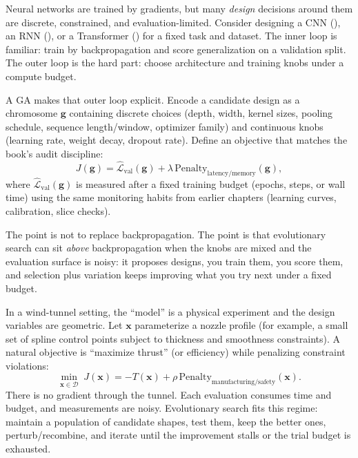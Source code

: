 \begin{tcolorbox}[summarybox, title={Application example: GA over neural networks (outer-loop design search)}]
Neural networks are trained by gradients, but many \emph{design} decisions around them are discrete, constrained, and evaluation\hyp{}limited. Consider designing a CNN (), an RNN (), or a Transformer () for a fixed task and dataset. The inner loop is familiar: train by backpropagation and score generalization on a validation split. The outer loop is the hard part: choose architecture and training knobs under a compute budget.
\par\smallskip
A GA makes that outer loop explicit. Encode a candidate design as a chromosome \(\mathbf{g}\) containing discrete choices (depth, width, kernel sizes, pooling schedule, sequence length/window, optimizer family) and continuous knobs (learning rate, weight decay, dropout rate). Define an objective that matches the book's audit discipline:
\[
J(\mathbf{g}) = \widehat{\mathcal{L}}_{\text{val}}(\mathbf{g})
  + \lambda\,\mathrm{Penalty}_{\text{latency/memory}}(\mathbf{g}),
\]
where \(\widehat{\mathcal{L}}_{\text{val}}(\mathbf{g})\) is measured after a fixed training budget (epochs, steps, or wall time) using the same monitoring habits from earlier chapters (learning curves, calibration, slice checks).
\par\smallskip
The point is not to replace backpropagation. The point is that evolutionary search can sit \emph{above} backpropagation when the knobs are mixed and the evaluation surface is noisy: it proposes designs, you train them, you score them, and selection plus variation keeps improving what you try next under a fixed budget.
\end{tcolorbox}

\begin{tcolorbox}[summarybox, title={Application example: jet-nozzle shape optimization (experiment in the loop)}]
In a wind-tunnel setting, the ``model'' is a physical experiment and the design variables are geometric. Let \(\mathbf{x}\) parameterize a nozzle profile (for example, a small set of spline control points subject to thickness and smoothness constraints). A natural objective is ``maximize thrust'' (or efficiency) while penalizing constraint violations:
\[
\min_{\mathbf{x}\in\mathcal{D}} \; J(\mathbf{x}) = -T(\mathbf{x}) + \rho\,\mathrm{Penalty}_{\text{manufacturing/safety}}(\mathbf{x}).
\]
There is no gradient through the tunnel. Each evaluation consumes time and budget, and measurements are noisy. Evolutionary search fits this regime: maintain a population of candidate shapes, test them, keep the better ones, perturb/recombine, and iterate until the improvement stalls or the trial budget is exhausted.
\end{tcolorbox}

